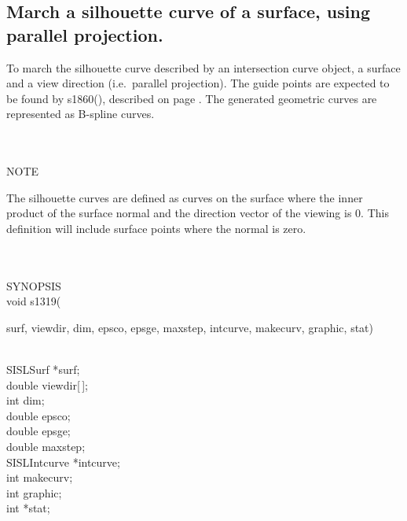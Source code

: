 \subsection{\sloppy March a silhouette curve of a surface, using parallel \mbox{projection}.}
\begin{minipg1}
  To march the silhouette curve described by an intersection curve object, a
  surface and a view direction (i.e.\ parallel projection).
  The guide points are expected to be found by s1860(), described on
  page \pageref{s1860}.
  The generated geometric curves are represented as B-spline curves.
\end{minipg1} \\ \\
NOTE\\
\>     \begin{minipg6}
The silhouette curves are defined as curves on the surface where the inner product of the surface normal and the direction vector of the viewing is 0. This definition will include surface points where the normal is zero.
\end{minipg6} \\ \\
SYNOPSIS\\
        \>void s1319(\begin{minipg3}
                        {\fov surf}, {\fov viewdir}, {\fov dim}, {\fov epsco}, {\fov epsge}, {\fov maxstep}, {\fov intcurve}, {\fov makecurv},
                        {\fov graphic}, {\fov stat})
                \end{minipg3}\\[0.3ex]
                \>\>    SISLSurf        \>      *{\fov surf};\\
                \>\>    double  \>      {\fov viewdir}[\,];\\
                \>\>    int     \>      {\fov dim};\\
                \>\>    double  \>      {\fov epsco};\\
                \>\>    double  \>      {\fov epsge};\\
                \>\>    double  \>      {\fov maxstep};\\
                \>\>    SISLIntcurve\>  *{\fov intcurve};\\
                \>\>    int     \>      {\fov makecurv};\\
                \>\>    int     \>      {\fov graphic};\\
                \>\>    int     \>      *{\fov stat};\\
